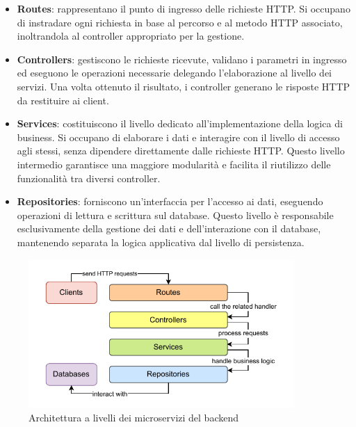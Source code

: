 \begin{itemize}
  \item \textbf{Routes}: rappresentano il punto di ingresso delle richieste HTTP. Si occupano di instradare ogni richiesta in base al percorso e al metodo HTTP associato, inoltrandola al controller appropriato per la gestione.

  \item \textbf{Controllers}: gestiscono le richieste ricevute, validano i parametri in ingresso ed eseguono le operazioni necessarie delegando l’elaborazione al livello dei servizi. Una volta ottenuto il risultato, i controller generano le risposte HTTP da restituire ai client.

  \item \textbf{Services}: costituiscono il livello dedicato all'implementazione della logica di business. Si occupano di elaborare i dati e interagire con il livello di accesso agli stessi, senza dipendere direttamente dalle richieste HTTP. Questo livello intermedio garantisce una maggiore modularità e facilita il riutilizzo delle funzionalità tra diversi controller.

  \item \textbf{Repositories}: forniscono un’interfaccia per l’accesso ai dati, eseguendo operazioni di lettura e scrittura sul database. Questo livello è responsabile esclusivamente della gestione dei dati e dell'interazione con il database, mantenendo separata la logica applicativa dal livello di persistenza.
\end{itemize}

\begin{figure}
  \centering
  \includegraphics[width=0.9\textwidth]{figures/microservice-architecture.pdf}
  \caption{Architettura a livelli dei microservizi del backend}
  \label{fig:microservice-architecture}
\end{figure}

